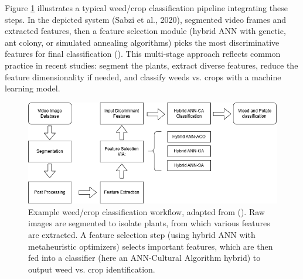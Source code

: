 \documentclass[letterpaper]{report}
\begin{document}
Figure \ref{fig:workflow-sabzi} illustrates a typical weed/crop classification pipeline integrating these steps. In the depicted system (Sabzi et al., 2020), segmented video frames  and extracted features, then a feature selection module (hybrid ANN with genetic, ant colony, or simulated annealing algorithms) picks the most discriminative features for final classification (\cite{Sabzi2020-af}). This multi-stage approach reflects common practice in recent studies: segment the plants, extract diverse features, reduce the feature dimensionality if needed, and classify weeds vs. crops with a machine learning model.

\begin{figure}[h!]
	\centering
	\includegraphics[width=0.5\linewidth]{./figures/sabzi-workflow.png}
	\caption[Color correction target and image set identification]{Example weed/crop classification workflow, adapted from \citeauthor{Sabzi2020-af} (\citeyear{Sabzi2020-af}). Raw images are segmented to isolate plants, from which various features are extracted. A feature selection step (using hybrid ANN with metaheuristic optimizers) selects important features, which are then fed into a classifier (here an ANN-Cultural Algorithm hybrid) to output weed vs. crop identification.}
	\label{fig:workflow-sabzi}
\end{figure}

%
\end{document}
